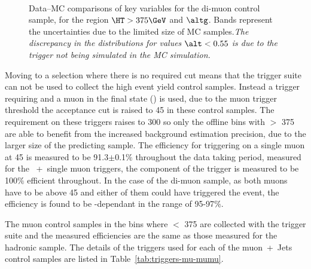 \begin{figure}[|h]
  \centering
   \\
  \caption{Data--MC comparisons of key variables for the di-muon control
    sample, for the region $\HT > 375\GeV$ and $\altg$. Bands represent the uncertainties due to the limited size
    of MC samples.{\it The discrepancy in the \alt
      distributions for values $\alt < 0.55$ is due to the trigger
      not being simulated in the MC simulation.}}
    \label{fig:diMuControl}
\end{figure}


Moving to a selection where there is no required \alt cut means that the \alt 
trigger suite can not be used to collect the high event yield control samples. 
Instead a trigger requiring \HT and a muon in the final state (\muht) is used, 
due to the muon trigger threshold the \PT acceptance cut is raised to 
\unit{45}{\GeV} in these control samples. The \HT requirement on these triggers 
raises to \unit{300}{\GeV} so only the offline bins with \HT $>$ 
\unit{375}{\GeV} are able to benefit from the increased background estimation 
precision, due to the larger size of the predicting sample. The efficiency for 
triggering on a single muon at \unit{45}{\GeV} is measured to be 
91.3$\pm$0.1$\%$ throughout the data taking period, measured for the 
\HT~+~single muon triggers, the \HT component of the trigger is measured to be 
100$\%$ efficient throughout. In the case of the di-muon sample, as both muons 
have to be above \unit{45}{\GeV} and either of them could have triggered the 
event, the efficiency is found to be \HT-dependant in the range of 95-97$\%$.

The muon control samples in the \HT bins where \HT $<$ \unit{375}{\GeV} are 
collected with the \alt trigger suite and the measured efficiencies are the 
same as those measured for the hadronic sample. The details of the triggers 
used for each of the muon~+~Jets control samples are listed in 
Table~\ref{tab:triggers-mu-mumu}.

